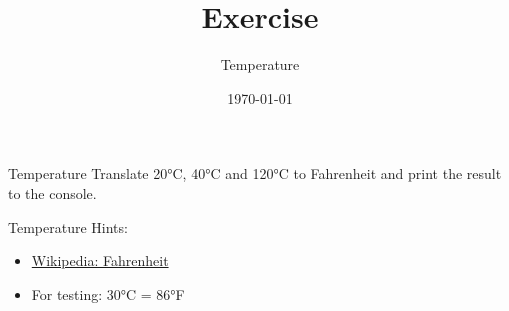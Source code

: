 


\title{Exercise}
\subtitle{Temperature}
\date{\today}




\begin{frame}
    \titlepage
\end{frame}

\begin{frame}{Temperature}
    Translate 20°C, 40°C and 120°C to Fahrenheit and print the result to the console.
\end{frame}

\begin{frame}{Temperature}
    Hints:
    \begin{itemize}
        \item \href{https://en.wikipedia.org/wiki/Fahrenheit}{Wikipedia: Fahrenheit}
        \item For testing: 30°C = 86°F
    \end{itemize}
\end{frame}



